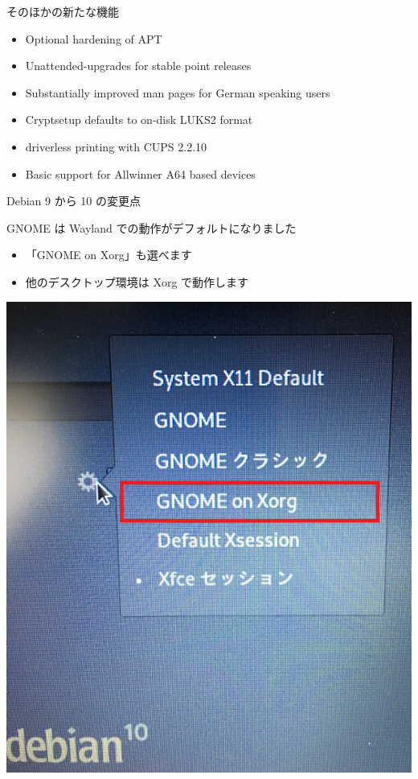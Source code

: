 
\begin{frame}{そのほかの新たな機能}%

\begin{itemize}
\item Optional hardening of APT
\item Unattended-upgrades for stable point releases
\item Substantially improved man pages for German speaking users
\item Cryptsetup defaults to on-disk LUKS2 format
\item driverless printing with CUPS 2.2.10
\item Basic support for Allwinner A64 based devices
\end{itemize}
    
\end{frame}


\begin{frame}{Debian 9 から 10 の変更点}%

GNOME は Wayland での動作がデフォルトになりました

\begin{itemize}
\item 「GNOME on Xorg」も選べます
\item 他のデスクトップ環境は Xorg で動作します
\end{itemize}

\begin{center}
  \includegraphics[width=0.5\hsize]{image201902/GDM_GNOME_select_mark.png}
\end{center}

\end{frame}


